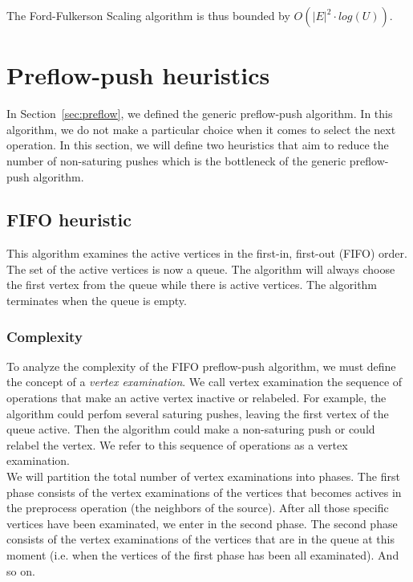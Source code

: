 The Ford-Fulkerson Scaling algorithm is thus bounded by $O(|E|^2 \cdot log(U))$.

\section{Preflow-push heuristics}

In Section~\ref{sec:preflow}, we defined the generic preflow-push algorithm. In this algorithm, we do not make a particular choice when it comes to select the next operation. In this section, we will define two heuristics that aim to reduce the number of non-saturing pushes which is the bottleneck of the generic preflow-push algorithm.

\subsection{FIFO heuristic}

This algorithm examines the active vertices in the first-in, first-out (FIFO) order. The set of the active vertices is now a queue. The algorithm will always choose the first vertex from the queue while there is active vertices. The algorithm terminates when the queue is empty. 

\subsubsection{Complexity}

To analyze the complexity of the FIFO preflow-push algorithm, we must define the concept of a \textit{vertex examination}. We call vertex examination the sequence of operations that make an active vertex inactive or relabeled. For example, the algorithm could perfom several saturing pushes, leaving the first vertex of the queue active. Then the algorithm could make a non-saturing push or could relabel the vertex. We refer to this sequence of operations as a vertex examination.\\

We will partition the total number of vertex examinations into phases. The first phase consists of the vertex examinations of the vertices that becomes actives in the preprocess operation (the neighbors of the source). After all those specific vertices have been examinated, we enter in the second phase. The second phase consists of the vertex examinations of the vertices that are in the queue at this moment (i.e. when the vertices of the first phase has been all examinated). And so on.\\

